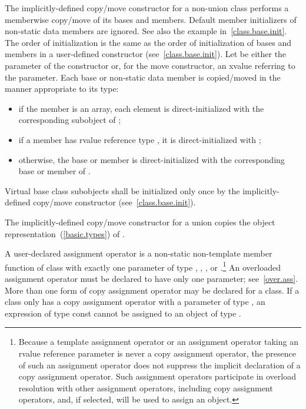 \pnum
The implicitly-defined copy/move constructor for a non-union class
performs a memberwise copy/move of its bases and members.
\enternote Default member initializers of non-static data members are ignored. See also the example in~\ref{class.base.init}. \exitnote
The order of initialization is the same as the order of initialization of bases
and members in a user-defined constructor (see~\ref{class.base.init}).
Let  be either the parameter of the constructor or, for the move constructor, an
xvalue referring to the parameter.
Each base or non-static data member
is copied/moved in the manner appropriate to its type:

\begin{itemize}
\item
if the member is an array, each element is
direct-initialized with the corresponding subobject of ;

\item
if a member  has rvalue reference type , it is direct-initialized with
;

\item
otherwise, the base or member is direct-initialized with the corresponding base or member of .
\end{itemize}

%
Virtual base class subobjects shall be initialized only once by
the implicitly-defined copy/move constructor (see~\ref{class.base.init}).

\pnum
The implicitly-defined copy/move constructor for a union
 copies the object representation~(\ref{basic.types}) of .%
%

\pnum
{}%
%
A user-declared  assignment operator  is a
non-static non-template member function of class  with exactly one
parameter of type , ,  ,
  or  
.\footnote{Because a template assignment operator or an assignment
operator taking an rvalue reference parameter is never a copy assignment
operator, the presence of such an assignment operator does not suppress the
implicit declaration of a copy assignment operator. Such assignment operators
participate in overload resolution with other assignment operators, including
copy assignment operators, and, if selected, will be used to assign an object.}
\enternote
An overloaded assignment operator must be declared to have only one parameter;
see~\ref{over.ass}.
\exitnote
\enternote
More than one form of copy assignment operator may be declared for a class.
\exitnote
\enternote
If a class
only has a copy assignment operator with a parameter of type
,
an expression of type const
cannot be assigned to an object of type
.
\enterexample

